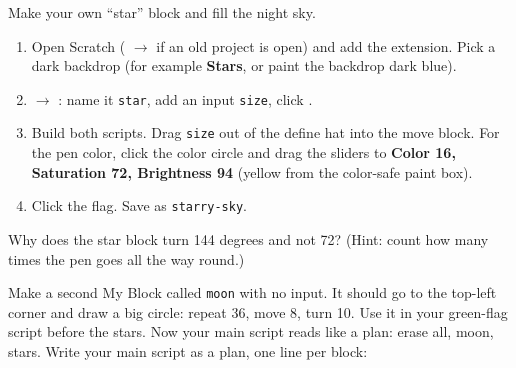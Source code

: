 \namedateline

\begin{core}
Make your own \enquote{star} block and fill the night sky.
\begin{enumerate}[leftmargin=1.4em,itemsep=1pt]
  \item Open Scratch ( $\rightarrow$  if an old project is open) and add the  extension. Pick a dark backdrop (for example \textbf{Stars}, or paint the backdrop dark blue).
  \item {} $\rightarrow$ : name it \texttt{star}, add an input \texttt{size}, click .
  \item Build both scripts. Drag \texttt{size} out of the define hat into the move block. For the pen color, click the color circle and drag the sliders to \textbf{Color 16, Saturation 72, Brightness 94} (yellow from the color-safe paint box).
  \item Click the flag. Save as \texttt{starry-sky}.
\end{enumerate}
\begin{center}
\begin{scratch}[scale=0.75]
\end{scratch}
\hspace{0.5cm}
\begin{scratch}[scale=0.75]
\end{scratch}
\end{center}
Why does the star block turn 144 degrees and not 72? (Hint: count how many times the pen goes all the way round.)
\end{core}

\begin{challenge}
Make a second My Block called \texttt{moon} with no input. It should go to the top-left corner and draw a big circle: repeat 36, move 8, turn 10. Use it in your green-flag script before the stars. Now your main script reads like a plan: erase all, moon, stars.
Write your main script as a plan, one line per block:
\end{challenge}

